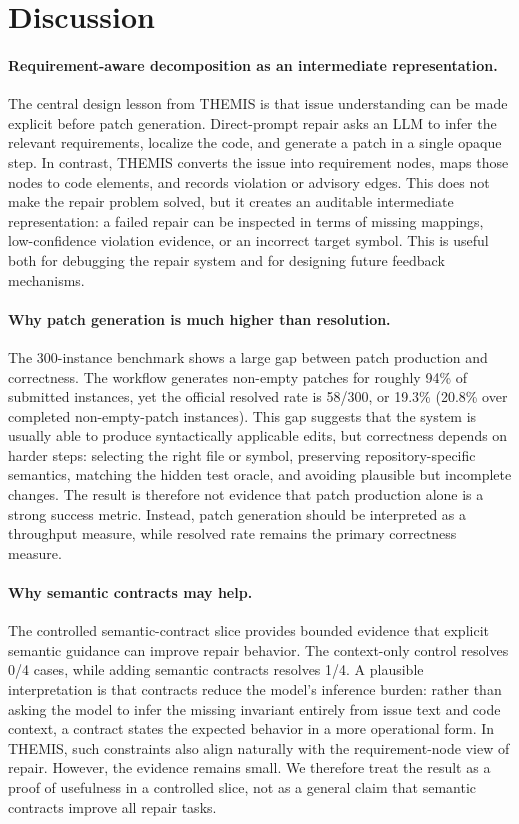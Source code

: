\documentclass[11pt]{article}
\begin{document}
\section{Discussion}
\label{sec:discussion}

\paragraph{Requirement-aware decomposition as an intermediate representation.}
The central design lesson from THEMIS is that issue understanding can be made explicit before patch generation.  Direct-prompt repair asks an LLM to infer the relevant requirements, localize the code, and generate a patch in a single opaque step.  In contrast, THEMIS converts the issue into requirement nodes, maps those nodes to code elements, and records violation or advisory edges.  This does not make the repair problem solved, but it creates an auditable intermediate representation: a failed repair can be inspected in terms of missing mappings, low-confidence violation evidence, or an incorrect target symbol.  This is useful both for debugging the repair system and for designing future feedback mechanisms.

\paragraph{Why patch generation is much higher than resolution.}
The 300-instance benchmark shows a large gap between patch production and correctness.  The workflow generates non-empty patches for roughly 94\% of submitted instances, yet the official resolved rate is 58/300, or 19.3\% (20.8\% over completed non-empty-patch instances).  This gap suggests that the system is usually able to produce syntactically applicable edits, but correctness depends on harder steps: selecting the right file or symbol, preserving repository-specific semantics, matching the hidden test oracle, and avoiding plausible but incomplete changes.  The result is therefore not evidence that patch production alone is a strong success metric.  Instead, patch generation should be interpreted as a throughput measure, while resolved rate remains the primary correctness measure.

\paragraph{Why semantic contracts may help.}
The controlled semantic-contract slice provides bounded evidence that explicit semantic guidance can improve repair behavior.  The context-only control resolves 0/4 cases, while adding semantic contracts resolves 1/4.  A plausible interpretation is that contracts reduce the model's inference burden: rather than asking the model to infer the missing invariant entirely from issue text and code context, a contract states the expected behavior in a more operational form.  In THEMIS, such constraints also align naturally with the requirement-node view of repair.  However, the evidence remains small.  We therefore treat the result as a proof of usefulness in a controlled slice, not as a general claim that semantic contracts improve all repair tasks.
\end{document}
